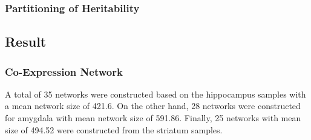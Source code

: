 \subsubsection{Partitioning of Heritability}

\subsection{Result}
\subsubsection{Co-Expression Network}
A total of 35 networks were constructed based on the hippocampus samples with a mean network size of 421.6.
On the other hand, 28 networks were constructed for amygdala with mean network size of 591.86.
Finally, 25 networks with mean size of 494.52 were constructed from the striatum samples.

